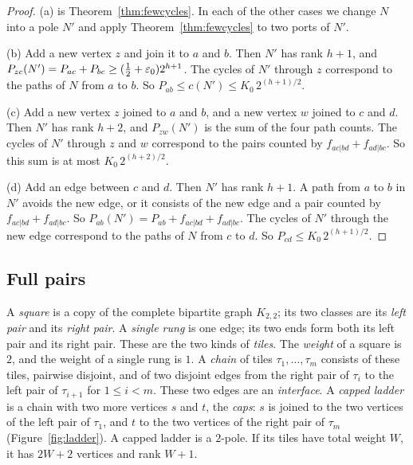 \begin{proof}
(a) is Theorem~\ref{thm:fewcycles}. In each of the other cases we change $N$ into a pole $N'$ and
apply Theorem~\ref{thm:fewcycles} to two ports of $N'$.

(b) Add a new vertex $z$ and join it to $a$ and $b$. Then $N'$ has rank $h+1$, and
$P_{zc}(N')=P_{ac}+P_{bc}\ge(\tfrac12+\varepsilon_0)2^{h+1}$. The cycles of $N'$ through $z$
correspond to the paths of $N$ from $a$ to $b$. So $P_{ab}\le c(N')\le K_0\,2^{(h+1)/2}$.

(c) Add a new vertex $z$ joined to $a$ and $b$, and a new vertex $w$ joined to $c$ and $d$. Then
$N'$ has rank $h+2$, and $P_{zw}(N')$ is the sum of the four path counts. The cycles of $N'$
through $z$ and $w$ correspond to the pairs counted by $f_{ac|bd}+f_{ad|bc}$. So this sum is at
most $K_0\,2^{(h+2)/2}$.

(d) Add an edge between $c$ and $d$. Then $N'$ has rank $h+1$. A path from $a$ to $b$ in $N'$
avoids the new edge, or it consists of the new edge and a pair counted by
$f_{ac|bd}+f_{ad|bc}$. So $P_{ab}(N')=P_{ab}+f_{ac|bd}+f_{ad|bc}$. The cycles of $N'$ through the
new edge correspond to the paths of $N$ from $c$ to $d$. So $P_{cd}\le K_0\,2^{(h+1)/2}$.
\end{proof}

\subsection{Full pairs}\label{sec:full}

A \emph{square} is a copy of the complete bipartite graph $K_{2,2}$; its two classes are its
\emph{left pair} and its \emph{right pair}. A \emph{single rung} is one edge; its two ends form
both its left pair and its right pair. These are the two kinds of \emph{tiles}. The \emph{weight}
of a square is $2$, and the weight of a single rung is $1$. A \emph{chain} of tiles
$\tau_1,\dots,\tau_m$ consists of these tiles, pairwise disjoint, and of two disjoint edges from
the right pair of $\tau_i$ to the left pair of $\tau_{i+1}$ for $1\le i<m$. These two edges are an
\emph{interface}. A \emph{capped ladder} is a chain with two more vertices $s$ and $t$, the
\emph{caps}: $s$ is joined to the two vertices of the left pair of $\tau_1$, and $t$ to the two
vertices of the right pair of $\tau_m$ (Figure~\ref{fig:ladder}). A capped ladder is a $2$-pole. If
its tiles have total weight $W$, it has $2W+2$ vertices and rank $W+1$.

